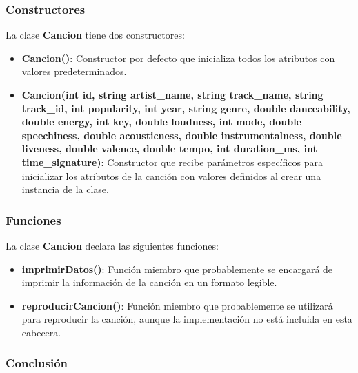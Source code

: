 \documentclass[corference]{IEEEtran}
\begin{document}
\begin{flushleft}
            \subsubsection{Constructores}
            
                \noindent\hspace*{4em}La clase \textbf{Cancion} tiene dos constructores:
                
                \begin{itemize}[left=4em]
                    \item \textbf{Cancion()}: Constructor por defecto que inicializa todos los atributos con valores predeterminados. 
                    \item \textbf{Cancion(int id, string artist\_name, string track\_name, string track\_id, int popularity, int year, string genre, double danceability, double energy, int key, double loudness, int mode, double speechiness, double acousticness, double instrumentalness, double liveness, double valence, double tempo, int duration\_ms, int time\_signature)}: Constructor que recibe parámetros específicos para inicializar los atributos de la canción con valores definidos al crear una instancia de la clase.
                \end{itemize}
            
            \subsubsection{Funciones}
            
                \noindent\hspace*{4em}La clase \textbf{Cancion} declara las siguientes funciones:
                
                \begin{itemize}[left=4em]
                    \item \textbf{imprimirDatos()}: Función miembro que probablemente se encargará de imprimir la información de la canción en un formato legible.
                    \item \textbf{reproducirCancion()}: Función miembro que probablemente se utilizará para reproducir la canción, aunque la implementación no está incluida en esta cabecera.
                \end{itemize}
            
            \subsubsection{Conclusión}
            

\end{flushleft}
\end{document}
